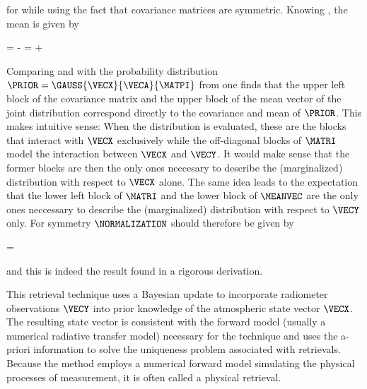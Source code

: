     for  while using the fact that covariance
    matrices are symmetric. Knowing , the mean is
    given by

    \placeformula[eq:gaussbayesjointmean]
    \startformula
        \MEANVEC = \MATRI \startpmatrix
                \MATP \VECA - \MATBT \MATQ \VECB \NR
                \MATQ \VECB \NR
            \stoppmatrix = \startpmatrix
                \VECA \NR
                \MATB \VECA + \VECB \NR
            \stoppmatrix \EQSTOP
    \stopformula

    Comparing  and  with the
    probability distribution $\PRIOR = \GAUSS{\VECX}{\VECA}{\MATPI}$ from
     one finds that the upper left block of the covariance
    matrix and the upper block of the mean vector of the joint distribution
    correspond directly to the covariance and mean of $\PRIOR$. This makes
    intuitive sense: When the distribution is evaluated, these are the blocks
    that interact with $\VECX$ exclusively while the off-diagonal blocks of
    $\MATRI$ model the interaction between $\VECX$ and $\VECY$. It would make
    sense that the former blocks are then the only ones neccesary to describe
    the (marginalized) distribution with respect to $\VECX$ alone. The same
    idea leads to the expectation that the lower left block of $\MATRI$ and the
    lower block of $\MEANVEC$ are the only ones neccessary to describe the
    (marginalized) distribution with respect to $\VECY$ only. For symmetry
    $\NORMALIZATION$ should therefore be given by
    
    \placeformula[eq:gaussbayesnorm]
    \startformula
        \NORMALIZATION = \GAUSS{\VECY}{\MATB \VECA + \VECB}{\MATQI + \MATB \MATPI \MATBT} \EQCOMMA
    \stopformula

    and this is indeed the result found in a rigorous derivation.

\stopsubsection

\stopsection


\startsection[title={Optimal Estimation},reference=ch:optimalestimation]

    This retrieval technique uses a Bayesian update to incorporate radiometer
    observations $\VECY$ into prior knowledge of the atmospheric state vector
    $\VECX$. The resulting state vector is consistent with the forward model
    (usually a numerical radiative transfer model) necessary for the technique
    and uses the a-priori information to solve the uniqueness problem
    associated with retrievals. Because the method employs a numerical forward
    model simulating the physical processes of measurement, it is often called
    a physical retrieval.

